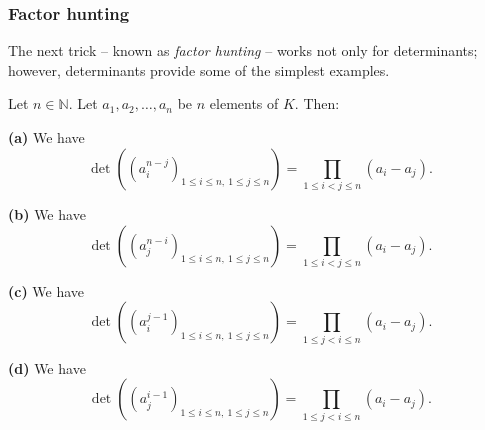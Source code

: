 \subsubsection{Factor hunting}

The next trick -- known as \emph{factor hunting} -- works not only for
determinants; however, determinants provide some of the simplest examples.

\begin{theorem}
\label{thm.det.vander}Let $n\in\mathbb{N}$. Let
$a_{1},a_{2},\ldots,a_{n}$ be $n$ elements of $K$. Then: \medskip

\textbf{(a)} We have%
\[
\det\left(  \left(  a_{i}^{n-j}\right)  _{1\leq i\leq n,\ 1\leq j\leq
n}\right)  =\prod_{1\leq i<j\leq n}\left(  a_{i}-a_{j}\right)  .
\]


\textbf{(b)} We have%
\[
\det\left(  \left(  a_{j}^{n-i}\right)  _{1\leq i\leq n,\ 1\leq j\leq
n}\right)  =\prod_{1\leq i<j\leq n}\left(  a_{i}-a_{j}\right)  .
\]


\textbf{(c)} We have%
\[
\det\left(  \left(  a_{i}^{j-1}\right)  _{1\leq i\leq n,\ 1\leq j\leq
n}\right)  =\prod_{1\leq j<i\leq n}\left(  a_{i}-a_{j}\right)  .
\]


\textbf{(d)} We have%
\[
\det\left(  \left(  a_{j}^{i-1}\right)  _{1\leq i\leq n,\ 1\leq j\leq
n}\right)  =\prod_{1\leq j<i\leq n}\left(  a_{i}-a_{j}\right)  .
\]

\end{theorem}

